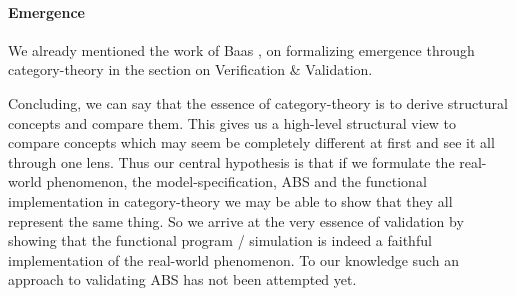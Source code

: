 \paragraph{Emergence}
We already mentioned the work of Baas \cite{baas_emergence_1994}, \cite{baas_emergence_1997} on formalizing emergence through category-theory in the section on Verification \& Validation.

Concluding, we can say that the essence of category-theory is to derive structural concepts and compare them. This gives us a high-level structural view to compare concepts which may seem be completely different at first and see it all through one lens. Thus our central hypothesis is that if we formulate the real-world phenomenon, the model-specification, ABS and the functional implementation in category-theory we may be able to show that they all represent the same thing. So we arrive at the  very essence of validation by showing that the functional program / simulation is indeed a faithful implementation of the real-world phenomenon. To our knowledge such an approach to validating ABS has not been attempted yet.